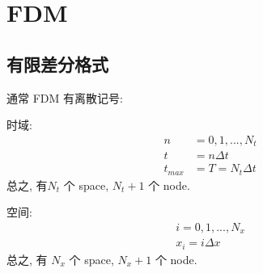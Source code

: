 
\chapter{FDM}

\section{有限差分格式}

通常 FDM 有离散记号:


时域: 
\begin{equation}
    \begin{aligned}
        n&=0,1,...,N_t \\
        t&=n\Delta t \\
        t_{max} &= T = N_t \Delta t
    \end{aligned}
\end{equation}
总之, 有$N_t$ 个 space, $N_t + 1$ 个 node. 

空间:
\begin{equation}
    \begin{aligned}
        i = 0, 1, ..., N_x \\
        x_i = i \Delta x
    \end{aligned}
\end{equation}
总之, 有 $N_x$ 个 space, $N_x + 1$ 个 node. 

